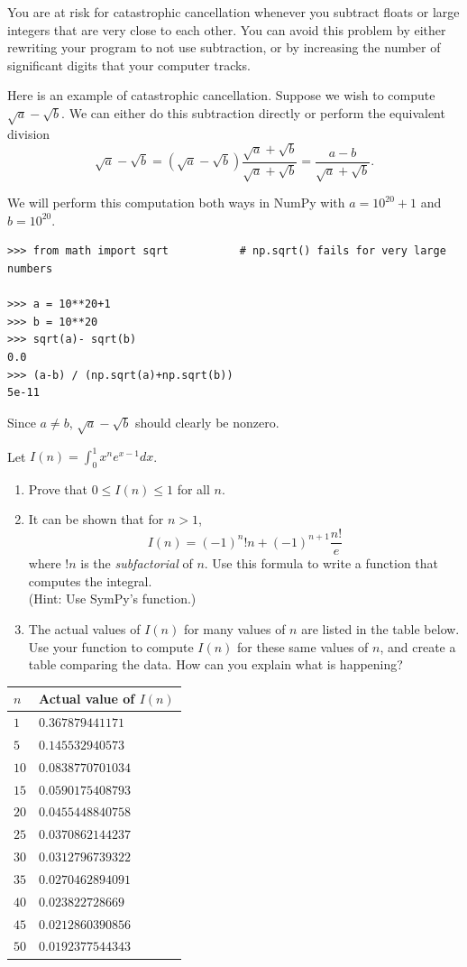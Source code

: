 You are at risk for catastrophic cancellation whenever you subtract floats or large integers that are very close to each other.
You can avoid this problem by either rewriting your program to not use subtraction, or by increasing the number of significant digits that your computer tracks.

Here is an example of catastrophic cancellation.
Suppose we wish to compute $\sqrt{a}-\sqrt{b}$. We can either do this subtraction directly or perform the equivalent division
\[
\sqrt{a}-\sqrt{b} = (\sqrt{a}-\sqrt{b})\frac{\sqrt{a}+\sqrt{b}}{\sqrt{a}+\sqrt{b}} = \frac{a-b}{\sqrt{a}+\sqrt{b}}.
\]

We will perform this computation both ways in NumPy with $a=10^{20}+1$ and $b=10^{20}$.
\begin{lstlisting}
>>> from math import sqrt           # np.sqrt() fails for very large numbers

>>> a = 10**20+1
>>> b = 10**20
>>> sqrt(a)- sqrt(b)
0.0
>>> (a-b) / (np.sqrt(a)+np.sqrt(b))
5e-11
\end{lstlisting}
Since $a \neq b$, $\sqrt{a}-\sqrt{b}$ should clearly be nonzero.

\begin{problem} %
Let $I(n) = \int_0^1 x^n e^{x - 1} dx$.
\begin{enumerate}
\item Prove that $0 \leq I(n) \leq 1$ for all $n$.
\item It can be shown that for $n>1$,
\[
I(n) = \left(-1\right)^{n} !n + \left(-1\right)^{n + 1} \frac{n!}{e}
\]
where $!n$ is the \emph{subfactorial} of $n$.
Use this formula to write a function that computes the integral.
\\ (Hint: Use SymPy's  function.)
\item The actual values of $I(n)$ for many values of $n$ are listed in the table below.
Use your function  to compute $I(n)$ for these same values of $n$, and create a table comparing the data.
How can you explain what is happening?
\end{enumerate}

\begin{center}
\begin{tabular}{|l|l|}
\hline
$n$  & Actual value of $I(n)$ \\
\hline
$1$  & $0.367879441171$ \\
$5$  & $0.145532940573$ \\
$10$ & $0.0838770701034$ \\
$15$ & $0.0590175408793$ \\
$20$ & $0.0455448840758$ \\
$25$ & $0.0370862144237$ \\
$30$ & $0.0312796739322$ \\
$35$ & $0.0270462894091$ \\
$40$ & $0.023822728669$ \\
$45$ & $0.0212860390856$ \\
$50$ & $0.0192377544343$ \\
\hline
\end{tabular}
\end{center}
\end{problem}


